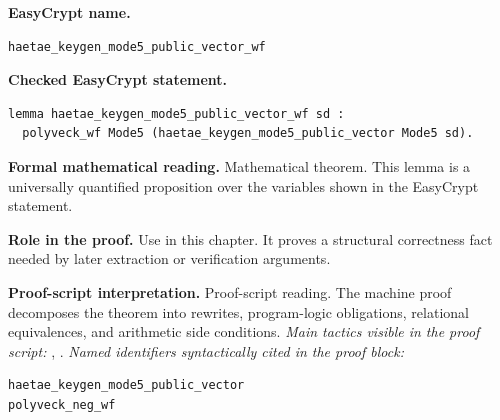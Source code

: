 \begin{formaltheorem}
\noindent\textbf{EasyCrypt name.}
\begin{lstlisting}[language=EasyCrypt,basicstyle=\ttfamily\scriptsize]
haetae_keygen_mode5_public_vector_wf
\end{lstlisting}
\noindent\textbf{Checked EasyCrypt statement.}
\begin{lstlisting}[language=EasyCrypt,basicstyle=\ttfamily\scriptsize]
lemma haetae_keygen_mode5_public_vector_wf sd :
  polyveck_wf Mode5 (haetae_keygen_mode5_public_vector Mode5 sd).
\end{lstlisting}
\noindent\textbf{Formal mathematical reading.}
Mathematical theorem. This lemma is a universally quantified proposition over the variables shown in the EasyCrypt statement.

\noindent\textbf{Role in the proof.}
Use in this chapter. It proves a structural correctness fact needed by later extraction or verification arguments.

\noindent\textbf{Proof-script interpretation.}
Proof-script reading. The machine proof decomposes the theorem into rewrites, program-logic obligations, relational equivalences, and arithmetic side conditions.
\emph{Main tactics visible in the proof script:} , .
\emph{Named identifiers syntactically cited in the proof block:}
\begin{lstlisting}[language=EasyCrypt,basicstyle=\ttfamily\scriptsize]
haetae_keygen_mode5_public_vector
polyveck_neg_wf
\end{lstlisting}

\end{formaltheorem}

